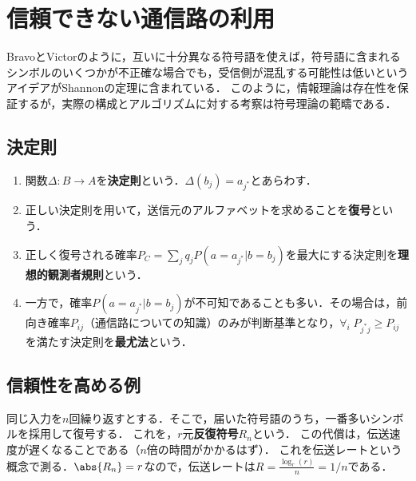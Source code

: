 \documentclass[uplatex,dvipdfmx]{jsreport}
\begin{document}
\section{信頼できない通信路の利用}

\begin{tcolorbox}[colframe=ForestGreen, colback=ForestGreen!10!white,breakable,colbacktitle=ForestGreen!40!white,coltitle=black,fonttitle=\bfseries\sffamily,
title=]
BravoとVictorのように，互いに十分異なる符号語を使えば，符号語に含まれるシンボルのいくつかが不正確な場合でも，受信側が混乱する可能性は低いというアイデアがShannonの定理に含まれている．
このように，情報理論は存在性を保証するが，実際の構成とアルゴリズムに対する考察は符号理論の範疇である．
\end{tcolorbox}

\subsection{決定則}

\begin{definition}\mbox{}
    \begin{enumerate}
        \item 関数$\Delta:B\to A$を\textbf{決定則}という．$\Delta(b_j)=a_{j^*}$とあらわす．
        \item 正しい決定則を用いて，送信元のアルファベットを求めることを\textbf{復号}という．
        \item 正しく復号される確率$P_C=\sum_{j}q_jP(a=a_{j^*}|b=b_j)$を最大にする決定則を\textbf{理想的観測者規則}という．
        \item 一方で，確率$P(a=a_{j^*}|b=b_j)$が不可知であることも多い．その場合は，前向き確率$P_{ij}$（通信路についての知識）のみが判断基準となり，$\forall_{i}\;P_{j^*j}\ge P_{ij}$を満たす決定則を\textbf{最尤法}という．
    \end{enumerate}
\end{definition}

\subsection{信頼性を高める例}

\begin{example}
    同じ入力を$n$回繰り返すとする．そこで，届いた符号語のうち，一番多いシンボルを採用して復号する．
    これを，$r$元\textbf{反復符号}$R_n$という．
    この代償は，伝送速度が遅くなることである（$n$倍の時間がかかるはず）．
    これを伝送レートという概念で測る．$\abs{R_n}=r$なので，伝送レートは$R=\frac{\log_r(r)}{n}=1/n$である．
\end{example}
\end{document}
